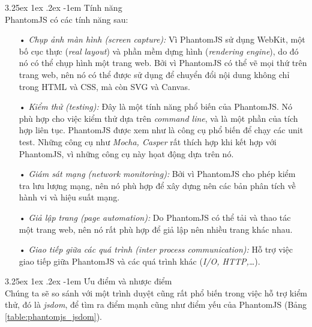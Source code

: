 \documentclass[12pt,a4paper]{article}
\makeatletter
\newcommand{\myparagraph}[1]{\paragraph{#1}\mbox{}\\} %
\renewcommand\paragraph{\@startsection{paragraph}{5}{\z@}%
  {3.25ex \@plus1ex \@minus.2ex}%
  {-1em}%
  {\normalfont\normalsize\bfseries}}
\makeatother
\begin{document}
\myparagraph{Tính năng}
PhantomJS có các tính năng sau:
\begin{itemize}
\item[•] \emph{Chụp ảnh màn hình (screen capture):} Vì PhantomJS sử dụng WebKit, một bố cục thực (\textit{real layout}) và phần mềm dựng hình (\textit{rendering engine}), do đó nó có thể chụp hình một trang web. Bởi vì PhantomJS có thể vẽ mọi thứ trên trang web, nên nó có thể được sử dụng để chuyển đổi nội dung không chỉ trong HTML và CSS, mà còn SVG và Canvas.
\item[•] \emph{Kiểm thử (testing):} Đây là một tính năng phổ biến của PhantomJS. Nó phù hợp cho việc kiểm thử dựa trên \textit{command line}, và là một phần của tích hợp liên tục. PhantomJS được xem như là công cụ phổ biến để chạy các unit test. Những công cụ như \textit{Mocha, Casper} rất thích hợp khi kết hợp với PhantomJS, vì những công cụ này họat động dựa trên nó.
\item[•] \emph{Giám sát mạng (network monitoring):} Bởi vì PhantomJS cho phép kiểm tra lưu lượng mạng, nên nó phù hợp để xây dựng nên các bản phân tích về hành vi và hiệu suất mạng.
\item[•] \emph{Giả lập trang (page automation):} Do PhantomJS có thể tải và thao tác một trang web, nên nó rất phù hợp để giả lập nên nhiều trang khác nhau.
\item[•] \emph{Giao tiếp giữa các quá trình (inter process communication):} Hỗ trợ việc giao tiếp giữa PhantomJS và các quá trình khác (\textit{I/O, HTTP,…}).
\end{itemize}

\myparagraph{Ưu điểm và nhược điểm}
Chúng ta sẽ so sánh\cite{jsdom_phantomjs} với một trình duyệt cũng rất phổ biến trong việc hỗ trợ kiểm thử, đó là \textit{jsdom}, để tìm ra điểm mạnh cũng như điểm yếu của PhantomJS (Bảng \ref{table:phantomjs_jsdom}).
\end{document}
